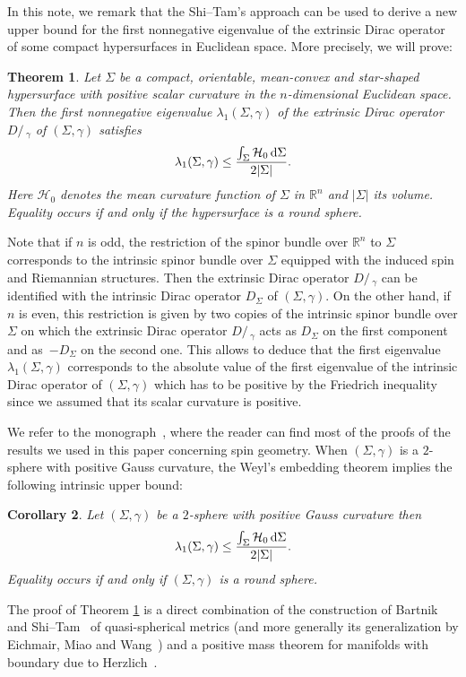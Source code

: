 \documentclass[pdftex]{sigma}
\numberwithin{equation}{section}
\newtheorem{Theorem}{Theorem}[section]
\newtheorem{Corollary}[Theorem]{Corollary}
\def\D{D\!\!\!\!/\,}
\begin{document}
In this note, we remark that the Shi--Tam's approach can be used to derive a new upper bound for the first nonnegative eigenvalue of the extrinsic Dirac operator of some compact hypersurfaces in Euclidean space. More precisely, we will prove:
\begin{Theorem}\label{NewUpperBound}
Let $\Sigma$ be a compact, orientable, mean-convex and star-shaped hypersurface with positive scalar curvature in the $n$-dimensional Euclidean space. Then the first nonnegative eigenvalue $\lambda_1(\Sigma,\gamma)$ of the extrinsic Dirac operator $\D_\gamma$ of $(\Sigma,\gamma)$ satisfies
\begin{gather}\label{NewUpperBound1}
\lambda_1(\Sigma,\gamma)\leq\frac{\int_\Sigma \mathcal{H}_0\,{\rm d}\Sigma}{2|\Sigma|}.
\end{gather}
Here $\mathcal{H}_0$ denotes the mean curvature function of $\Sigma$ in $\mathbb{R}^{n}$ and $|\Sigma|$ its volume. Equality occurs if and only if the hypersurface is a round sphere.
\end{Theorem}
Note that if $n$ is odd, the restriction of the spinor bundle over $\mathbb{R}^n$ to $\Sigma$ corresponds to the intrinsic spinor bundle over $\Sigma$ equipped with the induced spin and Riemannian structures. Then the extrinsic Dirac operator $\D_\gamma$ can be identified with the intrinsic Dirac operator $D_\Sigma$ of $(\Sigma,\gamma)$. On the other hand, if $n$ is even, this restriction is given by two copies of the intrinsic spinor bundle over $\Sigma$ on which the extrinsic Dirac operator $\D_\gamma$ acts as $D_\Sigma$ on the first component and as~$-D_\Sigma$ on the second one. This allows to deduce that the first eigenvalue $\lambda_1(\Sigma,\gamma)$ corresponds to the absolute value of the first eigenvalue of the intrinsic Dirac operator of $(\Sigma,\gamma)$ which has to be positive by the Friedrich inequality~\cite{Friedrich3} since we assumed that its scalar curvature is positive.

We refer to the monograph~\cite{BourguignonHijaziMilhoratMoroianu}, where the reader can find most of the proofs of the results we used in this paper concerning spin geometry. When $(\Sigma,\gamma)$ is a $2$-sphere with positive Gauss curvature, the Weyl's embedding theorem implies the following intrinsic upper bound:
\begin{Corollary}\label{2SphereDirac}
Let $(\Sigma,\gamma)$ be a $2$-sphere with positive Gauss curvature then
\begin{gather*}
\lambda_1(\Sigma,\gamma)\leq\frac{\int_\Sigma \mathcal{H}_0\,{\rm d}\Sigma}{2|\Sigma|}.
\end{gather*}
Equality occurs if and only if $(\Sigma,\gamma)$ is a round sphere.
\end{Corollary}
The proof of Theorem \ref{NewUpperBound} is a direct combination of the construction of Bartnik~\cite{Bartnik1} and Shi--Tam~\cite{ShiTam1} of quasi-spherical metrics (and more generally its generalization by Eichmair, Miao and Wang~\cite{EichmairMiaoWang}) and a positive mass theorem for manifolds with boundary due to Herzlich~\cite{Herzlich1,Herzlich2}.
\end{document}
